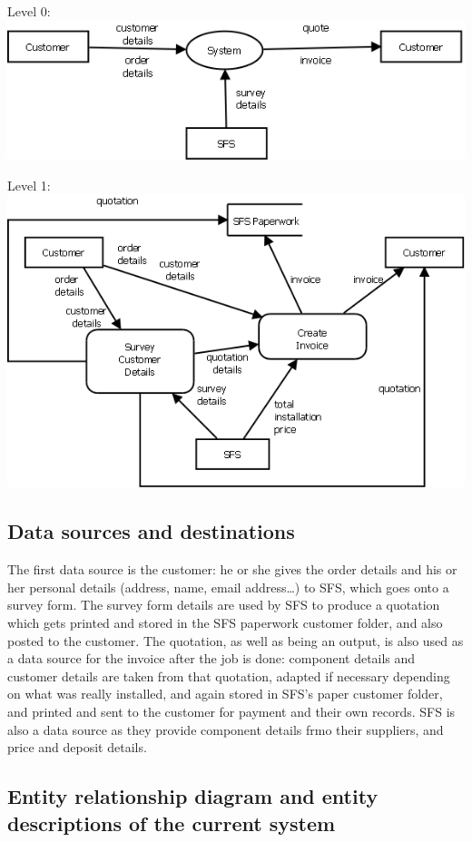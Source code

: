 Level 0:\\
\includegraphics[scale=0.5]{dfd_old_zero_n}

Level 1:\\
\includegraphics[scale=0.45]{dfd_old_one_n}
		\subsection{Data sources and destinations}

The first data source is the customer: he or she gives the order details and his or her personal details (address, name, email address\ldots) to SFS, which goes onto a survey form.  The survey form details are used by SFS to produce a quotation which gets printed and stored in the SFS paperwork customer folder, and also posted to the customer.  The quotation, as well as being an output, is also used as a data source for the invoice after the job is done: component details and customer details are taken from that quotation, adapted if necessary depending on what was really installed, and again stored in SFS's paper customer folder, and printed and sent to the customer for payment and their own records.  SFS is also a data source as they provide component details frmo their suppliers, and price and deposit details.
		\subsection{Entity relationship diagram and entity descriptions of the current system}

